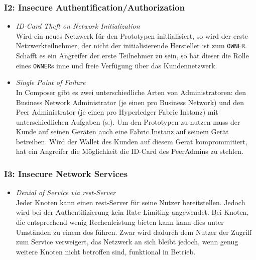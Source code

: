         \subsubsection*{I2: Insecure Authentification/Authorization}
            \begin{itemize}[leftmargin=0cm,label={}]
    	        \item \emph{ID-Card Theft on Network Initialization}\label{vuln:prototype_id_theft}\\
    	            Wird ein neues Netzwerk für den Prototypen initlialisiert, so wird der erste Netzwerkteilnehmer, der nicht der initialisierende Hersteller ist zum \colorbox{light-gray}{\lstinline{OWNER}}. 
    	            Schafft es ein Angreifer der erste Teilnehmer zu sein, so hat dieser die Rolle eines \colorbox{light-gray}{\lstinline{OWNER}}s inne und freie Verfügung über das Kundennetzwerk.
    	        \item \emph{Single Point of Failure}\label{vuln:prototype_spf}\\
                    In Composer gibt es zwei unterschiedliche Arten von Administratoren: den Business Network Administrator (je einen pro Business Network) und den Peer Administrator (je einen pro Hyperledger Fabric Instanz) mit unterschiedlichen Aufgaben (s.). 
                    Um den Prototypen zu nutzen muss der Kunde auf seinen Geräten auch eine Fabric Instanz auf seinem Gerät betreiben. 
                    Wird der Wallet des Kunden auf diesem Gerät komprommitiert, hat ein Angreifer die Möglichkeit die ID-Card des PeerAdmins zu stehlen. 
            \end{itemize}
            
        \subsubsection*{I3: Insecure Network Services}
            \begin{itemize}[leftmargin=0cm,label={}]
                \item \emph{Denial of Service via \gls{rest}-Server}\label{vuln:prototype_dos}\\
        	        Jeder Knoten kann einen \gls{rest}-Server für seine Nutzer bereitstellen. 
        	        Jedoch wird bei der Authentifizierung kein Rate-Limiting angewendet. 
        	        Bei Knoten, die entsprechend wenig Rechenleistung bieten kann kann dies unter Umständen zu einem \gls{dos} führen. 
        	        Zwar wird dadurch dem Nutzer der Zugriff zum Service verweigert, das Netzwerk an sich bleibt jedoch, wenn genug weitere Knoten nicht betroffen sind, funktional in Betrieb.
            \end{itemize}
            
